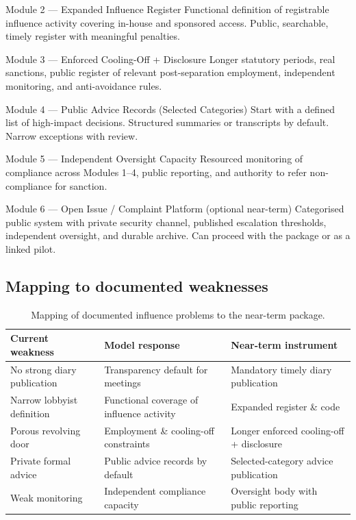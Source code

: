 \documentclass[11pt,a4paper]{article}
\begin{document}
\begin{modulebox}{Module 2 --- Expanded Influence Register}
Functional definition of registrable influence activity covering in-house and sponsored access. Public, searchable, timely register with meaningful penalties.
\end{modulebox}

\begin{modulebox}{Module 3 --- Enforced Cooling-Off + Disclosure}
Longer statutory periods, real sanctions, public register of relevant post-separation employment, independent monitoring, and anti-avoidance rules.
\end{modulebox}

\begin{modulebox}{Module 4 --- Public Advice Records (Selected Categories)}
Start with a defined list of high-impact decisions. Structured summaries or transcripts by default. Narrow exceptions with review.
\end{modulebox}

\begin{modulebox}{Module 5 --- Independent Oversight Capacity}
Resourced monitoring of compliance across Modules 1--4, public reporting, and authority to refer non-compliance for sanction.
\end{modulebox}

\begin{modulebox}{Module 6 --- Open Issue / Complaint Platform (optional near-term)}
Categorised public system with private security channel, published escalation thresholds, independent oversight, and durable archive. Can proceed with the package or as a linked pilot.
\end{modulebox}

\subsection{Mapping to documented weaknesses}

\begin{table}[H]
\centering
\small
\begin{tabular}{@{}p{4.0cm}p{5.2cm}p{4.3cm}@{}}
\toprule
\textbf{Current weakness} & \textbf{Model response} & \textbf{Near-term instrument} \\
\midrule
No strong diary publication & Transparency default for meetings & Mandatory timely diary publication \\
Narrow lobbyist definition & Functional coverage of influence activity & Expanded register \& code \\
Porous revolving door & Employment \& cooling-off constraints & Longer enforced cooling-off + disclosure \\
Private formal advice & Public advice records by default & Selected-category advice publication \\
Weak monitoring & Independent compliance capacity & Oversight body with public reporting \\
\bottomrule
\end{tabular}
\caption{Mapping of documented influence problems to the near-term package.}
\label{tab:lobbyingmap}
\end{table}
\end{document}
